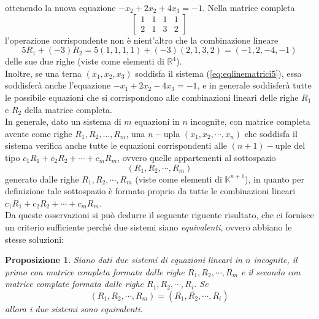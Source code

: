 \documentclass{book}
\theoremstyle{definition}
\theoremstyle{plain}
\newtheorem{prop}{Proposizione}[section]
\begin{document}
ottenendo la nuova equazione $-x_2+2x_2+4x_3=-1$. Nella matrice completa
\begin{equation}
  \label{eq:determinante4}
  \begin{bmatrix}
    1 & 1 & 1 & 1\\
    2 & 1 & 3 & 2
  \end{bmatrix}
\end{equation}
l'operazione corrispondente non è nient'altro che la combinazione lineare
\begin{equation*}
  5R_1+(-3)R_2=5(1,1,1,1)+(-3)(2,1,3,2)=(-1,2,-4,-1)
\end{equation*}
delle sue due righe (viste come elementi di $\mathds{R}^4$).\\
Inoltre, se una terna $(x_1,x_2,x_3)$ soddisfa il sistema
(\ref{eq:eqlinematrici5}), essa soddisferà anche l'equazione
$-x_1+2x_2-4x_3=-1$, e in generale soddisferà tutte le possibile equazioni
che si corrispondono alle combinazioni lineari delle righe $R_1$ e $R_2$
della matrice completa.\\
In generale, dato un sistema di $m$ equazioni in $n$ incognite, con
matrice completa avente come righe $R_1,R_2,\dots,R_m$, una $n-$upla
$(x_1,x_2,\cdots,x_n)$ che soddisfa il sistema verifica anche tutte le
equazioni corrispondenti alle $(n+1)-$uple del tipo
$c_1R_1+c_2R_2+\cdots+c_mR_m$, ovvero quelle appartenenti al sottospazio
\begin{equation*}
  (R_1,R_2,\cdots,R_m)
\end{equation*}
generato dalle righe $R_1,R_2,\cdots,R_m$ (viste come elementi di
$\mathds{K}^{n+1}$), in quanto per definizione tale sottospazio è formato
proprio da tutte le combinazioni lineari $c_1R_1+c_2R_2+\cdots+c_mR_m$.\\
Da queste osservazioni si può dedurre il seguente riguente risultato, che
ci fornisce un criterio sufficiente perché due sistemi siano
\textit{equivalenti}, ovvero abbiano le stesse soluzioni:
\begin{prop}
  \label{prop:determinante1}
  Siano dati due sistemi di equazioni lineari in $n$ incognite, il
  primo con matrice completa formata dalle righe $R_1,R_2,\cdots,R_m$ e
  il secondo con matrice complate formata dalle righe
  $R_1,R_2,\cdots,R_i$. Se
  \begin{equation*}
    (R_1,R_2,\cdots,R_m)=(\bar{R_1},\bar{R_2},\cdots,\bar{R}_i)
  \end{equation*}
  allora i due sistemi sono equivalenti.
\end{prop}
\end{document}

